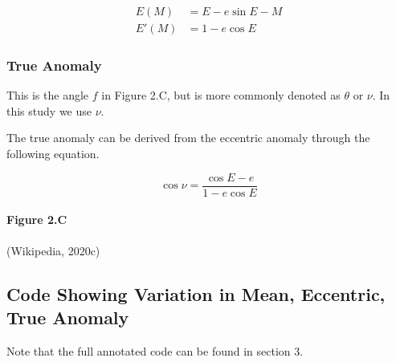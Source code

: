 \documentclass[11pt]{article}
\begin{document}
\begin{align}
E(M)  & = E - e\sin{E} - M \\
E'(M) & = 1 - e\cos{E}
\end{align}

\hypertarget{true-anomaly}{%
\subsubsection{True Anomaly}\label{true-anomaly}}

This is the angle \(f\) in Figure 2.C, but is more commonly denoted as
\(\theta\) or \(\nu\). In this study we use \(\nu\).

The true anomaly can be derived from the eccentric anomaly through the
following equation.

\begin{equation*}
\cos{\nu} = \frac{ \cos{E} - e }{ 1 - e\cos{E} } 
\end{equation*}

    \hypertarget{figure-2.c}{%
\paragraph{Figure 2.C}\label{figure-2.c}}

(Wikipedia, 2020c)

    \hypertarget{code-showing-variation-in-mean-eccentric-true-anomaly}{%
\subsection{Code Showing Variation in Mean, Eccentric, True Anomaly}\label{code-showing-variation-in-mean-eccentric-true-anomaly}}

Note that the full annotated code can be found in section 3.
\end{document}
